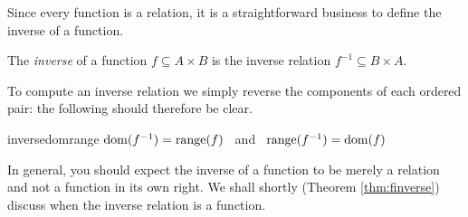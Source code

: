 
Since every function is a relation, it is a straightforward business to define the inverse of a function.

\begin{defn}{}{}
	The \emph{inverse} of a function $f\subseteq A\times B$ is the inverse relation $f^{-1}\subseteq B\times A$.
\end{defn}

To compute an inverse relation we simply reverse the components of each ordered pair: the following should therefore be clear.

\begin{thm}{}{inversedomrange}
	$\operatorname{dom}(f^{-1})=\operatorname{range}(f)$ \ and \ $\operatorname{range}(f^{-1})=\operatorname{dom}(f)$
\end{thm}

In general, you should expect the inverse of a function to be merely a relation and not a function in its own right. We shall shortly (Theorem \ref{thm:finverse}) discuss when the inverse relation is a function.

